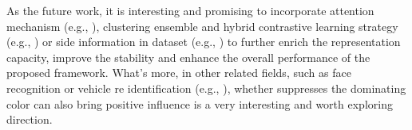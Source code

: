 \documentclass[journal]{IEEEtran}
\def\eg{e.g.}
\begin{document}
As the future work, it is interesting and promising to incorporate attention mechanism (\eg, \cite{Si:CVPR2018, VIT:ICLR2021}), clustering ensemble and hybrid contrastive learning strategy (\eg, \cite{Sun:ACPR21}) or side information in dataset (\eg, \cite{chen:cvpr2021})  to further enrich the representation capacity, improve the stability and enhance the overall performance of the proposed framework. 
{ What's more, in other related fields, such as face recognition or vehicle re identification (\eg, \cite{liu:ICME2016,liu:IEM2017}), whether suppresses the dominating color can also  bring positive influence is a very interesting and worth exploring direction.}

































\ifCLASSOPTIONcaptionsoff
  \newpage
\fi









{




}
\end{document}
